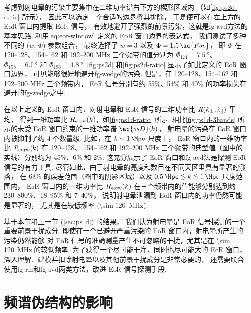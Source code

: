 考虑到射电晕的污染主要集中在二维功率谱右下方的楔形区域内
（如\autoref{fig:ps2d-ratio} 所示），
因此可以选定一个合适的边界将其排除，
于是便可以在左上方的 EoR 窗口内提取 EoR 信号，
有效地避开了强烈的前景污染，这就是\ac{fg-avd}方法的基本思路.
利用\autoref{eq:eor-window} 定义的 EoR 窗口边界的表达式，
我们测试了多种不同的 ($w$, $\Phi$) 参数组合，
最终选择了 $w = 3$ 以及 $\Phi = 1.5\,\ac{Fov}$，
即 $\Phi$ 在 \numrange{120}{128}、\numrange{154}{162}
和 \numrange{192}{200} \si{\MHz} 三个频带的值分别为
$\Phi_{124} = \SI{7.5}{\degree}$、
$\Phi_{158} = \SI{6.0}{\degree}$ 和
$\Phi_{196} = \SI{4.8}{\degree}$.
\autoref{fig:ps2d} 和\autoref{fig:ps2d-ratio} 显示了如此定义的 EoR 窗口边界，
可见能够很好地避开\ac{fg-wedge}的污染.
但是，在 \numrange{120}{128}、\numrange{154}{162}
和 \numrange{192}{200} \si{\MHz} 三个频带内，
EoR 信号分别有约 55\%、54\% 和 40\% 的功率损失在避开的\ac{fg-wedge}之中.

在以上定义的 EoR 窗口内，对射电晕和 EoR 信号的二维功率比 $R(k_{\perp}, k_{\parallel})$ 平均，
得到一维功率比 $R_{\mathrm{eorw}}(k)$，如\autoref{fig:ps1d-ratio} 所示.
相比\autoref{fig:ps1d-3bands} 所示的未受 EoR 窗口约束的一维功率谱 $\ac{psD}(k)$，
射电晕的污染在 EoR 窗口内被抑制了约 4 个数量级.
比如，在 $k \sim \SI{1}{\per\Mpc}$ 尺度上，
EoR 窗口内的一维功率比 $R_{\mathrm{eorw}}(k)$ 在 \numrange{120}{128}、
\numrange{154}{162} 和 \numrange{192}{200} \si{\MHz}
三个频带的典型值（图中的实线）分别约为 45\%、6\% 和 2\%.
这充分展示了 EoR 窗口和\ac{fg-avd}法是探测 EoR 信号的有力工具.
尽管如此，由于射电晕的亮度和数目在不同天区里具有显著的涨落，
在 68\% 的误差范围（图中的阴影区域）以及
$\SI{0.5}{\per\Mpc} \lesssim k \lesssim \SI{1}{\per\Mpc}$ 尺度范围内，
EoR 窗口内的一维功率比 $R_{\mathrm{eorw}}(k)$ 在三个频带内的值能够分别达到约
\numrange{230}{800}\%、\numrange{18}{95}\% 和 \numrange{7}{40}\%，
说明射电晕泄漏到 EoR 窗口内的功率仍然可能是显著的，
尤其是在较低频率 (\SI{\sim 120}{\MHz}).

基于本节和上一节 (\autoref{sec:ps1d}) 的结果，
我们认为射电晕是 EoR 信号探测的一个重要前景干扰成分.
即使在一个已避开严重污染的 EoR 窗口内，射电晕所产生的污染仍然能够
对 EoR 信号的准确测量产生不可忽略的干扰，尤其是在 \SI{\sim 120}{\MHz} 的较低频率.
为了获得一个尽可能干净、同时也尽可能大的 EoR 窗口，
深入理解、建模并扣除射电晕以及其他前景干扰成分是非常必要的，
还需要联合使用\ac{fg-rm}和\ac{fg-avd}两类方法，改进 EoR 信号探测手段.


\section{频谱伪结构的影响}
\label{sec:freq-artifacts}

